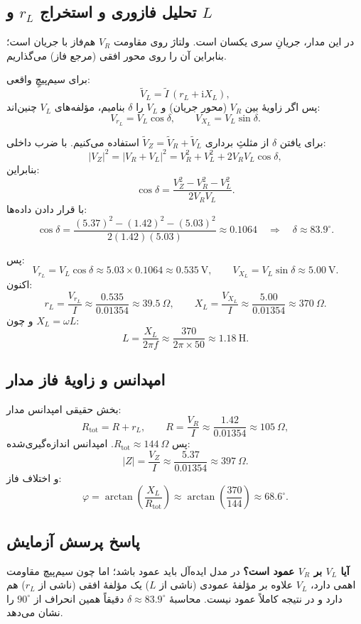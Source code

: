 \documentclass[a4paper,11pt]{article}
\newcommand{\ii}{\mathrm{i}} %
\newcommand{\abs}[1]{\left|#1\right|}
\begin{document}
\subsection{تحلیل فازوری و استخراج $r_L$ و $L$}
در این مدار، جریانِ سری یکسان است. ولتاژ روی مقاومت $V_R$ هم‌فاز با جریان است؛ بنابراین آن را روی محور افقی (مرجع فاز) می‌گذاریم.

برای سیم‌پیچِ واقعی:
\[
\tilde V_L = \tilde I\,(r_L+\ii X_L),
\]
پس اگر زاویهٔ بین $V_R$ (محور جریان) و $V_L$ را $\delta$ بنامیم، مؤلفه‌های $V_L$ چنین‌اند:
\[
V_{r_L}=V_L\cos\delta,\qquad V_{X_L}=V_L\sin\delta.
\]

برای یافتن $\delta$ از مثلثِ برداری $\tilde V_Z=\tilde V_R+\tilde V_L$ استفاده می‌کنیم. با ضرب داخلی:
\[
\abs{V_Z}^2=\abs{V_R+V_L}^2=V_R^2+V_L^2+2V_RV_L\cos\delta,
\]
بنابراین:
\[
\cos\delta=\frac{V_Z^2-V_R^2-V_L^2}{2V_RV_L}.
\]
با قرار دادن داده‌ها:
\[
\cos\delta=\frac{(5.37)^2-(1.42)^2-(5.03)^2}{2(1.42)(5.03)}\approx 0.1064
\quad\Rightarrow\quad
\delta\approx 83.9^\circ.
\]

پس:
\[
V_{r_L}=V_L\cos\delta \approx 5.03\times 0.1064 \approx 0.535~\mathrm{V},
\qquad
V_{X_L}=V_L\sin\delta \approx 5.00~\mathrm{V}.
\]
اکنون:
\[
r_L=\frac{V_{r_L}}{I}\approx \frac{0.535}{0.01354}\approx 39.5~\Omega,
\qquad
X_L=\frac{V_{X_L}}{I}\approx \frac{5.00}{0.01354}\approx 370~\Omega.
\]
و چون $X_L=\omega L$:
\[
L=\frac{X_L}{2\pi f}\approx \frac{370}{2\pi\times 50}\approx 1.18~\mathrm{H}.
\]

\subsection{امپدانس و زاویهٔ فاز مدار}
بخش حقیقی امپدانس مدار:
\[
R_{\text{tot}}=R+r_L,\qquad R=\frac{V_R}{I}\approx \frac{1.42}{0.01354}\approx 105~\Omega,
\]
پس $R_{\text{tot}}\approx 144~\Omega$.
امپدانس اندازه‌گیری‌شده:
\[
\abs{Z}=\frac{V_Z}{I}\approx \frac{5.37}{0.01354}\approx 397~\Omega.
\]
و اختلاف فاز:
\[
\varphi=\arctan\!\left(\frac{X_L}{R_{\text{tot}}}\right)\approx \arctan\!\left(\frac{370}{144}\right)\approx 68.6^\circ.
\]

\subsection{پاسخ پرسش آزمایش}
\textbf{آیا $V_L$ بر $V_R$ عمود است؟} در مدل ایده‌آل باید عمود باشد؛ اما چون سیم‌پیچ مقاومت اهمی دارد، $V_L$ علاوه بر مؤلفهٔ عمودی (ناشی از $L$) یک مؤلفهٔ افقی (ناشی از $r_L$) هم دارد و در نتیجه کاملاً عمود نیست. محاسبهٔ $\delta\approx 83.9^\circ$ دقیقاً همین انحراف از $90^\circ$ را نشان می‌دهد.
\end{document}
